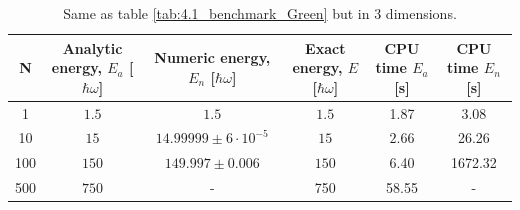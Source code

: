 \documentclass[a4paper, 10pt]{article}
\begin{document}
		 \begin{table}[ht!]
		 	\caption{Same as table \ref{tab:4.1_benchmark_Green} but in 3 dimensions.}\label{tab:4.1_benchmark_Green_3D}
		 	\begin{adjustwidth}{-2cm}{}
		 		\begin{tabular}{cccccc}
		 			N & Analytic energy, $E_a$ [$\hbar \omega$] & Numeric energy, $E_n$ [$\hbar \omega$] & Exact energy, $E$ [$\hbar \omega$]& CPU time $E_a$ [s] &CPU time $E_n$ [s]\\
		 			\hline
		 			1&$1.5$&$1.5$&$1.5$& 1.87&3.08\\
		 			10&$15$&$14.99999\pm 6\cdot 10^{-5}$&$15$& $2.66$&26.26\\
		 			100&$150$&$149.997\pm 0.006$&$150$&6.40&1672.32\\
		 			500&$750$&-&750 &58.55 &-
		 		\end{tabular}
		 	\end{adjustwidth}
		 \end{table}
		 \pagebreak
\end{document}
